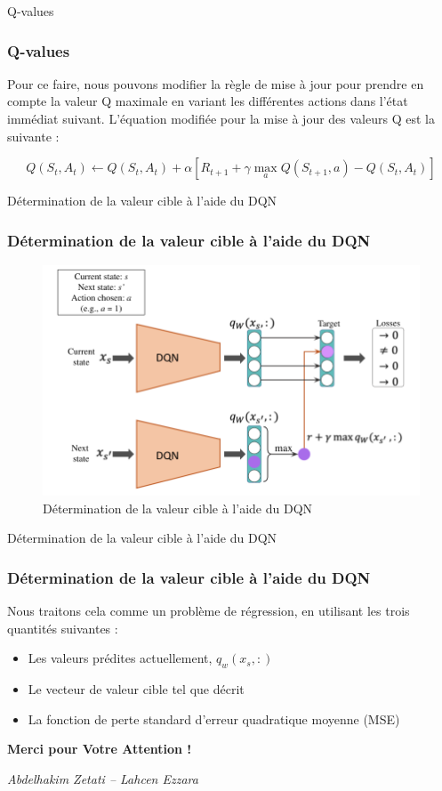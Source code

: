\documentclass[serif, aspectratio=169]{beamer}
\begin{document}
\begin{frame}{Q-values}
	\frametitle{Q-values}
	
	Pour ce faire, nous pouvons modifier la règle de mise à jour pour prendre en compte la valeur Q maximale en variant les différentes actions dans l'état immédiat suivant. L'équation modifiée pour la mise à jour des valeurs Q est la suivante :
	
	\[
	Q(S_t, A_t) \leftarrow Q(S_t, A_t) + \alpha [R_{t+1} + \gamma \max_{a} Q(S_{t+1}, a) - Q(S_t, A_t)]
	\]
	
\end{frame}


\begin{frame}{Détermination de la valeur cible à l'aide du DQN}
	\frametitle{Détermination de la valeur cible à l'aide du DQN}
	
	\begin{figure}[htpb]
		\centering
		\includegraphics[keepaspectratio, scale=0.3]{images/dqn-target.png}
		\caption{Détermination de la valeur cible à l'aide du DQN}
	\end{figure}
	
\end{frame}


\begin{frame}{Détermination de la valeur cible à l'aide du DQN}
	\frametitle{Détermination de la valeur cible à l'aide du DQN}
	
	Nous traitons cela comme un problème de régression, en utilisant les trois quantités suivantes :
	
	\begin{itemize}
		\item Les valeurs prédites actuellement, \( q_w(x_s, :) \)
		\item Le vecteur de valeur cible tel que décrit
		\item La fonction de perte standard d'erreur quadratique moyenne (MSE)
	\end{itemize}
	
\end{frame}




\begin{frame}
	\begin{center}
		
		\Huge \textbf{Merci pour Votre Attention !}
		
		\vspace{1cm}
		
		\Large
		
		\textit{Abdelhakim Zetati -- Lahcen Ezzara} \\
		

	\end{center}
\end{frame}
\end{document}

